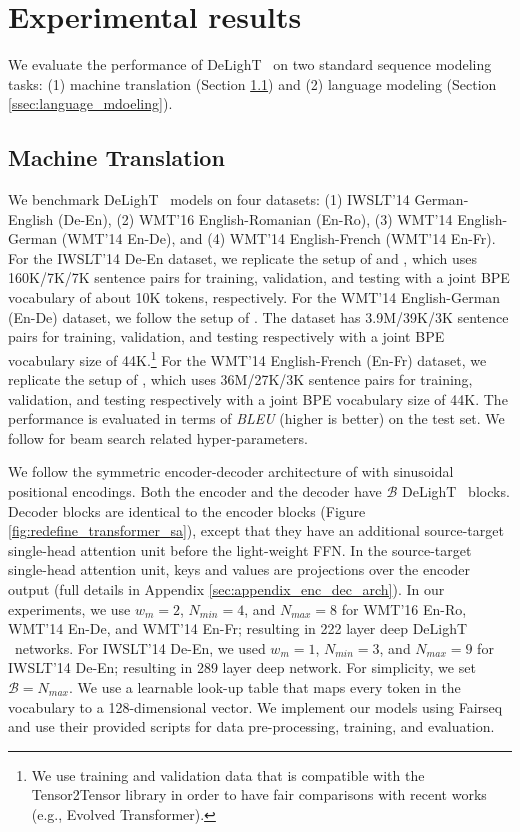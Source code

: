 \section{Experimental results}
\label{sec:results}
We evaluate the performance of DeLighT ~on two standard sequence modeling tasks: (1) machine translation (Section \ref{ssec:machine_translation}) and (2) language modeling (Section \ref{ssec:language_mdoeling}).

\subsection{Machine Translation}
\label{ssec:machine_translation}
 We benchmark DeLighT ~models on four datasets: (1) IWSLT'14 German-English (De-En), (2) WMT'16 English-Romanian (En-Ro), (3) WMT'14 English-German (WMT'14 En-De), and (4) WMT'14 English-French (WMT'14 En-Fr). For the IWSLT'14 De-En dataset, we replicate the setup of \citet{wu2018pay} and \citet{edunov2018classical}, which uses 160K/7K/7K sentence pairs for training, validation, and testing with a joint BPE vocabulary of about 10K tokens, respectively. For the WMT'14 English-German (En-De) dataset, we follow the setup of \citet{vaswani2017attention}. The dataset has 3.9M/39K/3K sentence pairs for training, validation, and testing respectively with a joint BPE vocabulary size of 44K.\footnote{We use training and validation data that is compatible with the Tensor2Tensor library \citep{tensor2tensor} in order to have fair comparisons with recent works (e.g., Evolved Transformer).} For the WMT'14 English-French (En-Fr) dataset, we replicate the setup of \citet{gehring2017convolutional}, which uses 36M/27K/3K sentence pairs for training, validation, and testing respectively with a joint BPE vocabulary size of 44K. The performance is evaluated in terms of \textit{BLEU} \citep{papineni2002bleu} (higher is better) on the test set. We follow \citet{wu2018pay} for beam search related hyper-parameters.

 We follow the symmetric encoder-decoder architecture of \citet{vaswani2017attention} with sinusoidal positional encodings. Both the encoder and the decoder have $\mathcal{B}$ DeLighT ~blocks. Decoder blocks are identical to the encoder blocks (Figure \ref{fig:redefine_transformer_sa}), except that they have an additional source-target single-head attention unit before the light-weight FFN. In the source-target single-head attention unit, keys and values are projections over the encoder output (full details in Appendix \ref{sec:appendix_enc_dec_arch}).  In our experiments, we use $w_m=2$, $N_{min}=4$, and $N_{max}=8$ for WMT'16 En-Ro, WMT'14 En-De, and WMT'14 En-Fr; resulting in 222 layer deep DeLighT ~networks. For IWSLT'14 De-En, we used $w_m=1$, $N_{min}=3$, and $N_{max}=9$ for IWSLT'14 De-En; resulting in 289 layer deep network. For simplicity, we set $\mathcal{B}=N_{max}$. We use a learnable look-up table that maps every token in the vocabulary to a 128-dimensional vector. We implement our models using Fairseq \citep{ott2019fairseq} and use their provided scripts for data pre-processing, training, and evaluation.

